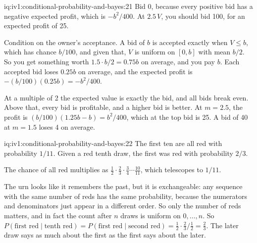 \begin{solution}{iq:iv1:conditional-probability-and-bayes:21}
Bid 0, because every positive bid has a negative expected profit, which is $-b^2/400$. At $2.5\,V$, you should bid 100, for an expected profit of 25.

Condition on the owner's acceptance. A bid of $b$ is accepted exactly when $V \le b$, which has chance $b/100$, and given that, $V$ is uniform on $[0, b]$ with mean $b/2$. So you get something worth $1.5 \cdot b/2 = 0.75b$ on average, and you pay $b$. Each accepted bid loses $0.25b$ on average, and the expected profit is $-(b/100)(0.25b) = -b^2/400$.

At a multiple of 2 the expected value is exactly the bid, and all bids break even. Above that, every bid is profitable, and a higher bid is better. At $m = 2.5$, the profit is $(b/100)(1.25b - b) = b^2/400$, which at the top bid is 25. A bid of 40 at $m = 1.5$ loses 4 on average.

\end{solution}

\begin{solution}{iq:iv1:conditional-probability-and-bayes:22}
The first ten are all red with probability $1/11$. Given a red tenth draw, the first was red with probability $2/3$.

The chance of all red multiplies as $\tfrac12 \cdot \tfrac23 \cdot \tfrac34 \cdots \tfrac{10}{11}$, which telescopes to $1/11$.

The urn looks like it remembers the past, but it is exchangeable: any sequence with the same number of reds has the same probability, because the numerators and denominators just appear in a different order. So only the number of reds matters, and in fact the count after $n$ draws is uniform on $0, \dots, n$. So $P(\text{first red} \mid \text{tenth red}) = P(\text{first red} \mid \text{second red}) = \tfrac12 \cdot \tfrac23 \big/ \tfrac12 = \tfrac23$. The later draw says as much about the first as the first says about the later.

\end{solution}

